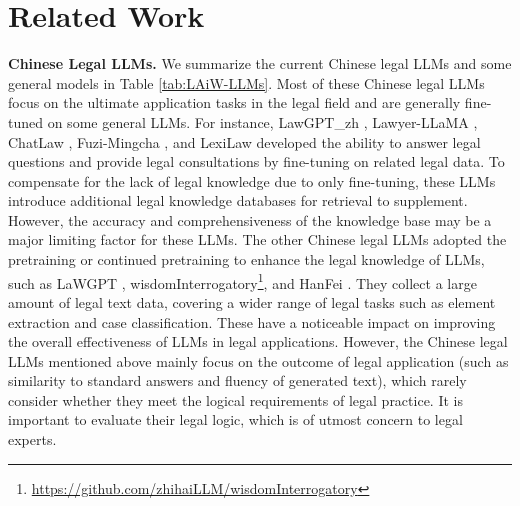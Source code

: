\section{Related Work}

\textbf{Chinese Legal LLMs.} 
We summarize the current Chinese legal LLMs and some general models in Table \ref{tab:LAiW-LLMs}.
Most of these Chinese legal LLMs focus on the ultimate application tasks in the legal field and are generally fine-tuned on some general LLMs.
For instance, LawGPT\_zh \cite{LAWGPT-zh}, Lawyer-LLaMA \cite{lawyer-llama-report}, ChatLaw \cite{cui2023chatlaw}, Fuzi-Mingcha \cite{fuzi.mingcha}, and LexiLaw developed the ability to answer legal questions and provide legal consultations by fine-tuning on related legal data. 
To compensate for the lack of legal knowledge due to only fine-tuning, these LLMs introduce additional legal knowledge databases for retrieval to supplement.
However, the accuracy and comprehensiveness of the knowledge base may be a major limiting factor for these LLMs.
The other Chinese legal LLMs adopted the pretraining or continued pretraining to enhance the legal knowledge of LLMs, such as LaWGPT \cite{LAWGPT}, wisdomInterrogatory\footnote{\url{https://github.com/zhihaiLLM/wisdomInterrogatory}}, and HanFei \cite{HanFei}.
They collect a large amount of legal text data, covering a wider range of legal tasks such as element extraction and case classification. These have a noticeable impact on improving the overall effectiveness of LLMs in legal applications.
However, the Chinese legal LLMs mentioned above mainly focus on the outcome of legal application (such as similarity to standard answers and fluency of generated text), which rarely consider whether they meet the logical requirements of legal practice. It is important to evaluate their legal logic, which is of utmost concern to legal experts.

